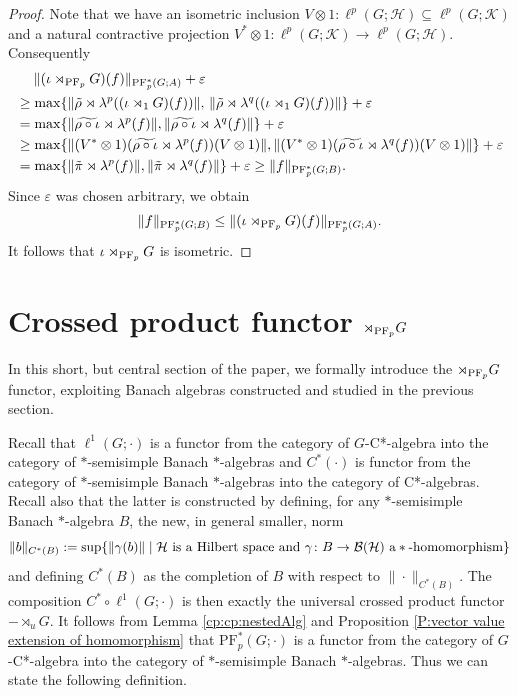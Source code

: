 \documentclass[12pt]{amsart}
\theoremstyle{definition}
\theoremstyle{remark}
\numberwithin{equation}{section}
\newcommand{\cpf}{\rtimes_{\textup{PF}_p} G}
\newcommand{\mc}{\mathcal}
\newcommand{\PF}[3]{\ensuremath{\mathrm{PF}_{#1}^*\left(#2; #3\right)}}
\begin{document}
\begin{proof}
	Note that we have an isometric inclusion $V\otimes 1\colon \ell^p(G;\mc{H})\subseteq \ell^p(G;\mc{K})$ and a natural contractive projection $V^*\otimes 1\colon \ell^p(G;\mc{K}) \to \ell^p(G;\mc{H})$.
	Consequently
	\begin{align*}
&\quad\;		\| (\iota\cpf)(f)\|_{\textup{PF}_p^*(G;A)}+\varepsilon\\
 &\geq
		\max \lbrace \|\tilde{\rho}\rtimes \lambda^p((\iota\rtimes_1 G)(f))\|,\,
		\|\tilde{\rho}\rtimes \lambda^q((\iota\rtimes_1 G)(f))\| \rbrace+\varepsilon\\
		&= \max \lbrace\|\widetilde{\rho\circ\iota}\rtimes \lambda^p(f)\|,
		\|\widetilde{\rho\circ \iota}\rtimes \lambda^q(f)\| \rbrace + \varepsilon \\
		&\geq	\max \lbrace\|(V^*\otimes 1)(\widetilde{\rho\circ\iota}\rtimes \lambda^p(f)) (V\otimes 1)\|,
		\|(V^*\otimes 1)(\widetilde{\rho\circ \iota}\rtimes \lambda^q(f))(V\otimes 1)\| \rbrace + \varepsilon \\
		&=\max \lbrace\|\tilde{\pi}\rtimes \lambda^p(f)\|,
		\|\tilde{\pi}\rtimes \lambda^q(f)\| \rbrace + \varepsilon \geq \|f \|_{\textup{PF}_p^*(G;B)}.
	\end{align*}
	Since $\varepsilon$ was chosen arbitrary, we obtain
	\begin{align*}
		\|f \|_{\textup{PF}^*_p(G;B)}\leq \|(\iota\cpf)(f) \|_{\textup{PF}^*_p(G;A)}.
	\end{align*}
	It follows that $\iota \cpf$ is isometric.
\end{proof}




\section{Crossed product functor $\rtimes_{\textup{PF}_p} G$}  \label{sec:C*}

In this short, but central section of the paper, we formally introduce the $\rtimes_{\textup{PF}_p} G$ functor, exploiting Banach algebras constructed and studied in the previous section.

Recall that $\ell^1(G;\cdot)$ is a functor from
the category of $G$-C*-algebra into the category of $*$-semisimple
Banach $*$-algebras and $C^*(\cdot)$ is functor from the category of $*$-semisimple
Banach $*$-algebras into the category of C*-algebras. Recall also that the latter is constructed by defining, for any  $*$-semisimple
Banach $*$-algebra $B$, the new, in general smaller, norm 
\[ \|b\|_{C^*(B)}:= \sup\{\|\gamma(b)\| \mid  
\mc{H}\textup{ is a Hilbert space and } \gamma\colon B \to \mc{B}(\mc{H}) \textup{ a}
\ast\textup{-homomorphism}\}\]
and defining $C^*(B)$ as the completion of $B$ with respect to $\|\cdot\|_{C^*(B)}$.
 The composition
$C^*\circ \ell^1(G;\cdot)$ is then exactly the  universal crossed product functor $-\rtimes_{u}G$. It follows from Lemma \ref{cp:cp:nestedAlg} and Proposition \ref{P:vector value extension of homomorphism} that $\PF{p}{G}{\cdot}$ is a functor from
the category of $G$-C*-algebra into the category of $*$-semisimple Banach $*$-algebras. Thus we can state the following definition.
\end{document}
